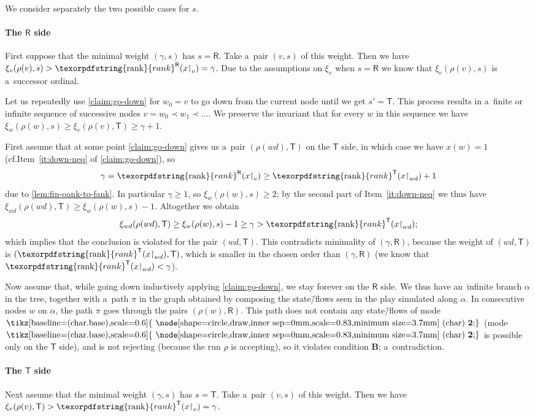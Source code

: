 \documentclass[11pt,a4paper]{amsart}
\theoremstyle{plain}
\theoremstyle{definition}
\theoremstyle{defC}
\theoremstyle{thmC}
\theoremstyle{plain}
\numberwithin{equation}{section}
\numberwithin{equation}{section}
\numberwithin{figure}{section}
\newcommand{\ident}[1]{\ensuremath{\texorpdfstring{\mathrm{\mathnm{#1}}}{#1}}\xspace}
\newcommand{\mathnm}[1]{#1}
\newcommand{\restr}{{\upharpoonright}}
\newcommand{\sT}{\mathsf{T}}
\newcommand{\sR}{\mathsf{R}}
\newcommand{\rankR}{\ident{rank}^\sR}
\newcommand{\rankT}{\ident{rank}^\sT}
\newcommand*\circled[1]{\tikz[baseline=(char.base),scale=0.6]{
            \node[shape=circle,draw,inner sep=0mm,scale=0.83,minimum size=3.7mm] (char) {\textbf{#1}};}}
\newcommand{\fb}{\mathbf{\text{\circled{2}}}}
\newcommand{\itemfont}[1]{\textbf{#1}}
\begin{document}
We consider separately the two possible cases for $s$.


\paragraph*{The $\sR$ side}
	First suppose that the minimal weight $(\gamma, s)$ has $s=\sR$.
	Take a~pair $(v,s)$ of this weight.
	Then we have $\xi_v(\rho(v),s)>\rankR(x\restr_v)=\gamma$.
	Due to the assumptions on $\xi_v$ when $s=\sR$ we know that $\xi_v(\rho(v),s)$ is a~successor ordinal.
	
	Let us repeatedly use \cref{claim:go-down} for $w_0=v$ to go down from the current node until we get $s'=\sT$.
	This process results in a~finite or infinite sequence of successive nodes $v=w_0\prec w_1\prec \ldots$.
	We preserve the invariant that for every $w$ in this sequence we have $\xi_{w}(\rho(w),s)\geq\xi_v(\rho(v),\sT)\geq\gamma+1$.
	
	First assume that at some point \cref{claim:go-down} gives us a~pair $(\rho(wd),\sT)$ on the $\sT$ side, in which case we have $x(w)=1$ (cf.\@ Item~\ref{it:down-neq} of \cref{claim:go-down}), so
	\[\gamma=\rankR(x\restr_v)\geq\rankT(x\restr_{wd})+1\]
	due to \cref{lem:fin-oank-to-fank}.
	In particular $\gamma\geq 1$, so $\xi_{w}(\rho(w),s)\geq 2$; by the second part of Item~\ref{it:down-neq} we thus have $\xi_{wd}(\rho(wd),\sT)\geq\xi_{w}(\rho(w),s)-1$.
	Altogether we obtain
	\[\xi_{wd}(\rho(wd),\sT)\geq\xi_{w}(\rho(w),s)-1\geq\gamma>\rankT(x\restr_{wd});\]
	which implies that the conclusion is violated for the pair $(wd, \sT)$.
	This contradicts minimality of $(\gamma,\sR)$, because the weight of $(wd, \sT)$ is $(\rankT(x\restr_{wd}),\sT)$, which is smaller in the chosen order than $(\gamma,\sR)$ (we know that $\rankT(x\restr_{wd})< \gamma$).
	
	Now assume that, while going down inductively applying \cref{claim:go-down}, we stay forever on the $\sR$ side.
	We thus have an~infinite branch $\alpha$ in the tree, together with a~path $\pi$ in the graph obtained by composing the state\=/flows seen in the play simulated along $\alpha$.
	In consecutive nodes $w$ on $\alpha$, the path $\pi$ goes through the pairs $(\rho(w),\sR)$.
	This path does not contain any state\=/flows of mode $\fb$ (mode $\fb$ is possible only on the $\sT$ side),
	and is not rejecting (because the run $\rho$ is accepting), so it violates condition \itemfont{B}; a~contradiction.
	

\paragraph*{The $\sT$ side}
	Next assume that the minimal weight $(\gamma, s)$ has $s=\sT$.
	Take a~pair $(v,s)$ of this weight.
	Then we have $\xi_v(\rho(v),\sT)>\rankT(x\restr_v)=\gamma$.
	
\end{document}
